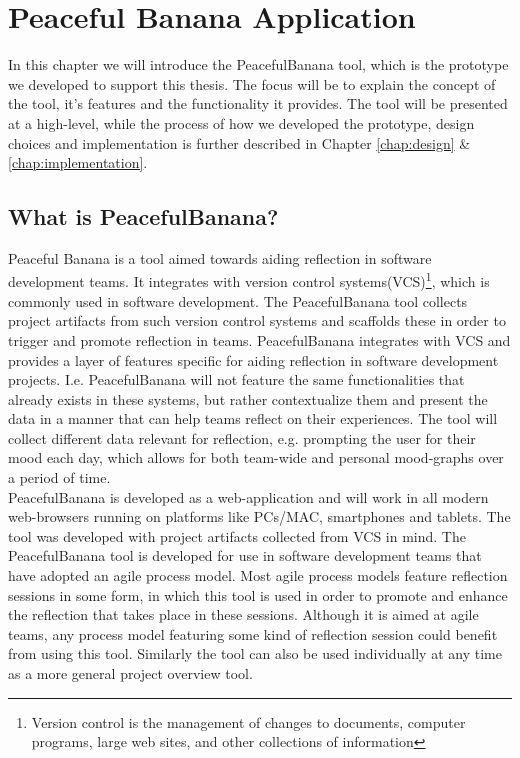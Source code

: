 \chapter{Peaceful Banana Application}
\label{peacefulBananaApplication}
In this chapter we will introduce the PeacefulBanana tool, which is the prototype we developed to support this thesis. The focus will be to explain the concept of the tool, it's features and the functionality it provides. The tool will be presented at a high-level, while the process of how we developed the prototype, design choices and implementation is further described in Chapter \ref{chap:design} \& \ref{chap:implementation}.
\section{What is PeacefulBanana?}
Peaceful Banana is a tool aimed towards aiding reflection in software development teams. It integrates with version control systems(VCS)\footnote{Version control is the management of changes to documents, computer programs, large web sites, and other collections of information}, which is commonly used in software development. The PeacefulBanana tool collects project artifacts from such version control systems and scaffolds these in order to trigger and promote reflection in teams. PeacefulBanana integrates with VCS and provides a layer of features specific for aiding reflection in software development projects. I.e.  PeacefulBanana will not feature the same functionalities that already exists in these systems, but rather contextualize them and present the data in a manner that can help teams reflect on their experiences. The tool will collect different data relevant for reflection, e.g. prompting the user for their mood each day, which allows for both team-wide and personal mood-graphs over a period of time. \\
PeacefulBanana is developed as a web-application and will work in all modern web-browsers running on platforms like PCs/MAC, smartphones and tablets.
The tool was developed with project artifacts collected from VCS in mind. The PeacefulBanana tool is developed for use in software development teams that have adopted an agile process model. Most agile process models feature reflection sessions in some form, in which this tool is used in order to promote and enhance the reflection that takes place in these sessions. Although it is aimed at agile teams, any process model featuring some kind of reflection session could benefit from using this tool. Similarly the tool can also be used individually at any time as a more general project overview tool. 

